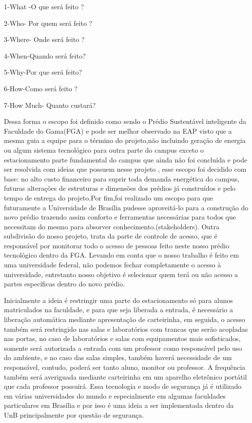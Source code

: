 1-What -O que será feito ?

2-Who- Por quem será feito ?

3-Where- Onde será feito ?

4-When-Quando será feito?

5-Why-Por que será feito?

6-How-Como será feito ?

7-How Much- Quanto custará?

    Dessa forma o escopo foi definido como sendo o Prédio Sustentável inteligente da Faculdade do Gama(FGA) e pode ser melhor observado na EAP visto que a mesma guia a equipe para o término do projeto,não incluindo geração de energia ou algum sistema tecnológico para outra parte do campus exceto o estacionamento parte fundamental do campus que ainda não foi concluída e pode ser resolvida com ideias que possuem nesse projeto , esse escopo foi decidido com base: no  alto custo financeiro para suprir toda demanda energética do campus, futuras alterações de estruturas e dimensões dos prédios já construídos e pelo tempo de entrega do projeto.Por fim,foi realizado um escopo para que futuramente a Universidade de Brasília pudesse aproveitá-lo para a construção do novo prédio trazendo assim conforto e ferramentas necessárias para todos que necessitam do mesmo para absorver conhecimento.(stakeholders).
    Outra subdivisão do nosso projeto, trata da parte de controle de acesso, que é responsável por monitorar todo o acesso de pessoas feito neste nosso prédio tecnológico dentro da FGA. Levando em conta que o nosso trabalho é feito em uma universidade federal, não podemos fechar completamente o acesso à universidade, entretanto nosso objetivo é selecionar quem terá ou não acesso a partes específicas dentro do novo prédio.

Inicialmente a ideia é restringir uma parte do estacionamento só para alunos matriculados na faculdade, e para que seja liberada a entrada, é necessário a liberação automática mediante apresentação de carteirinha, em seguida, o acesso também será restringido nas salas e laboratórios com trancas que serão acopladas nas portas, no caso de laboratórios e salas com equipamentos mais sofisticados, somente será autorizada a entrada com um professor como responsável pelo uso do ambiente, e no caso das salas simples, também haverá necessidade de um responsável, contudo, poderá ser tanto aluno, monitor ou professor. A frequência também será averiguada mediante carteirinha em um aparelho eletrônico portátil que cada professor possuirá. Essa tecnologia e modo de segurança já é utilizado em várias universidades do mundo e especialmente em algumas faculdades particulares em Brasília e por isso é uma ideia a ser implementada dentro da UnB principalmente por questão de segurança.

